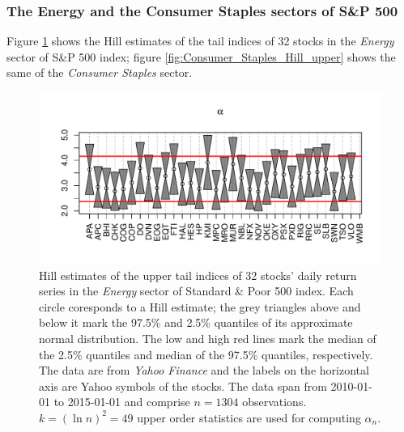 \documentclass{article}
\newcommand{\1}[1]{
  \mathbf{1}_{\{#1\}}
}
\begin{document}
\subsubsection{The Energy and the Consumer Staples sectors of S\&P 500}
Figure \ref{fig:Energy_Hill_upper} shows the Hill estimates of the
tail indices of 32 stocks in the {\it Energy} sector of S\&P 500
index; figure \ref{fig:Consumer_Staples_Hill_upper} shows the same of
the {\it Consumer Staples} sector.
\begin{figure}[htb!]
  \centering
  \includegraphics[width=\textwidth]{Energy_Hill_upper.pdf}
  \caption{Hill estimates of the upper tail indices of 32 stocks'
    daily return series in the {\it Energy} sector of Standard \& Poor
    500 index. Each circle coresponds to a Hill estimate; the grey
    triangles above and below it mark the 97.5\% and 2.5\% quantiles
    of its approximate normal distribution.
    The low and high red lines mark the median of the 2.5\% quantiles
    and median of the 97.5\% quantiles, respectively.
    The data are from {\it Yahoo Finance} and the labels on
    the horizontal axis are Yahoo symbols of the stocks. The data span
    from 2010-01-01 to 2015-01-01 and comprise $n=1304$
    observations. $k=(\ln n)^2 = 49$ upper order statistics are used
    for computing $\alpha_n$. 
  }
  \label{fig:Energy_Hill_upper}
\end{figure}
\end{document}
